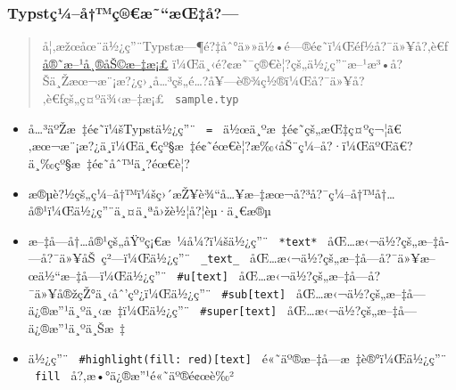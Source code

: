 \subsubsection{Typstç¼--å†™ç®€æ˜``æŒ‡å?---}\label{typstuxe7uxbcuxe5uxe7uxe6uxe6ux153uxe5}

\begin{quote}
å¦‚æžœåœ¨ä½¿ç''¨Typstæ---¶é?‡åˆ°ä»»ä½•é---®é¢˜ï¼Œéƒ½å?¯ä»¥å?‚è€ƒ
\href{https://typst.app/docs/}{å®˜æ--¹å¸®åŠ©æ--‡æ¡£}
ï¼Œä¸‹é?¢æ˜¯ç®€è¦?çš„ä½¿ç''¨æ--¹æ³•å?Šä¸Žæœ¬æ¨¡æ?¿ç›¸å\ldots³çš„é\ldots?å¥---è®¾ç½®ï¼Œå?¯ä»¥å?‚è€ƒçš„ç¤ºä¾‹æ--‡æ¡£
\texttt{\ sample.typ\ }
\end{quote}

\begin{itemize}
\item
  å\ldots³äºŽæ~‡é¢˜ï¼šTypstä½¿ç''¨ \texttt{\ =\ }
  ä½œä¸ºæ~‡é¢˜çš„æŒ‡ç¤ºç¬¦ã€‚æœ¬æ¨¡æ?¿ä¸­ï¼Œä¸€çº§æ~‡é¢˜éœ€è¦?æ‰‹åŠ¨ç¼--å?·ï¼ŒäºŒã€?ä¸‰çº§æ~‡é¢˜åˆ™ä¸?éœ€è¦?

\begin{Shaded}
\begin{Highlighting}[]
\end{Highlighting}
\end{Shaded}
\item
  æ®µè?½çš„ç¼--å†™ï¼šç›´æŽ¥è¾``å\ldots¥æ--‡æœ¬å?³å?¯ç¼--å†™å†\ldots å®¹ï¼Œä½¿ç''¨ä¸¤ä¸ªå›žè½¦å?¦èµ·ä¸€æ®µ

\begin{Shaded}
\begin{Highlighting}[]

\end{Highlighting}
\end{Shaded}
\item
  æ--‡å­---å†\ldots å®¹çš„åŸºç¡€æ~¼å¼?ï¼šä½¿ç''¨ \texttt{\ *text*\ }
  åŒ\ldots æ‹¬ä½?çš„æ--‡å­---å?¯ä»¥åŠ~ç²---ï¼Œä½¿ç''¨
  \texttt{\ \_text\_\ }
  åŒ\ldots æ‹¬ä½?çš„æ--‡å­---å?¯ä»¥æ--œä½``æ--‡å­---ï¼Œä½¿ç''¨
  \texttt{\ \#u{[}text{]}\ }
  åŒ\ldots æ‹¬ä½?çš„æ--‡å­---å?¯ä»¥å®žçŽ°ä¸‹åˆ'çº¿ï¼Œä½¿ç''¨
  \texttt{\ \#sub{[}text{]}\ }
  åŒ\ldots æ‹¬ä½?çš„æ--‡å­---ä¿®æ''¹ä¸ºä¸‹æ~‡ï¼Œä½¿ç''¨
  \texttt{\ \#super{[}text{]}\ }
  åŒ\ldots æ‹¬ä½?çš„æ--‡å­---ä¿®æ''¹ä¸ºä¸Šæ~‡

\begin{Shaded}
\begin{Highlighting}[]
\end{Highlighting}
\end{Shaded}
\item
  ä½¿ç''¨ \texttt{\ \#highlight(fill:\ red){[}text{]}\ }
  é«˜äº®æ--‡å­---æ~‡è®°ï¼Œä½¿ç''¨ \texttt{\ fill\ }
  å?‚æ•°ä¿®æ''¹é«˜äº®é¢œè‰²


\end{itemize}
